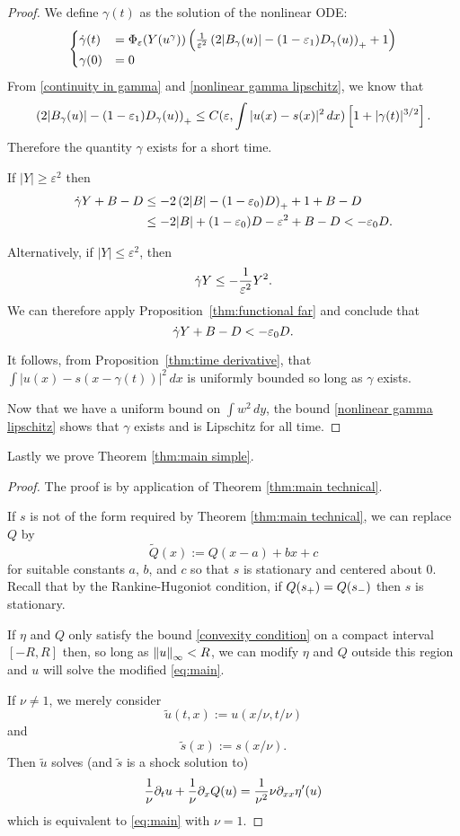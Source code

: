 \begin{proof}
We define $\gamma(t)$ as the solution of the nonlinear ODE:
\[ \begin{cases}
\dot{\gamma}(t) &= \Phi_\varepsilon(Y(u^\gamma)) \left( \frac{1}{\varepsilon^2} \left( 2|B_\gamma(u)| - (1-\varepsilon_1) D_\gamma(u) \right)_+ + 1 \right) \\
\gamma(0) &= 0
\end{cases} \]
From \eqref{continuity in gamma} and \eqref{nonlinear gamma lipschitz}, we know that
\[ \left( 2|B_\gamma(u)| - (1-\varepsilon_1) D_\gamma(u) \right)_+ \leq C(\varepsilon, \int |u(x) - s(x)|^2 \,dx) \left[ 1 + |\gamma(t)|^{3/2} \right]. \]
Therefore the quantity $\gamma$ exists for a short time.  

If $|Y| \geq \varepsilon^2$ then 
\begin{align*} 
\dot{\gamma} Y + B - D &\leq - 2 \left( 2|B| - (1-\varepsilon_0)D \right)_+ + 1 + B - D
\\ &\leq -2|B| + (1-\varepsilon_0)D - \varepsilon^2 + B - D < -\varepsilon_0 D.
\end{align*}

Alternatively, if $|Y| \leq \varepsilon^2$, then 
\[ \dot{\gamma} Y \leq - \frac{1}{\varepsilon^2} Y^2. \]
We can therefore apply Proposition~\ref{thm:functional far} and conclude that
\[ \dot{\gamma} Y + B - D < -\varepsilon_0 D. \]

It follows, from Proposition~\ref{thm:time derivative}, that $\int |u(x) - s(x-\gamma(t))|^2 \,dx$ is uniformly bounded so long as $\gamma$ exists.  

Now that we have a uniform bound on $\int w^2 \,dy$, the bound \eqref{nonlinear gamma lipschitz} shows that $\gamma$ exists and is Lipschitz for all time.  
\end{proof}

Lastly we prove Theorem \ref{thm:main simple}.  

\begin{proof}
The proof is by application of Theorem \ref{thm:main technical}.  

If $s$ is not of the form required by Theorem \ref{thm:main technical}, we can replace $Q$ by
\[ \tilde{Q}(x) := Q(x-a) + bx + c \]
for suitable constants $a$, $b$, and $c$ so that $s$ is stationary and centered about 0.  Recall that by the Rankine-Hugoniot condition, if $Q(s_+) = Q(s_-)$ then $s$ is stationary.  

If $\eta$ and $Q$ only satisfy the bound \eqref{convexity condition} on a compact interval $[-R,R]$ then, so long as $\left\lVert u\right\rVert_\infty < R$, we can modify $\eta$ and $Q$ outside this region and $u$ will solve the modified \eqref{eq:main}.  

If $\nu \neq 1$, we merely consider 
\[ \tilde{u}(t,x) := u(x/\nu, t/\nu) \]
and 
\[ \tilde{s}(x) := s(x/\nu). \]
Then $\tilde{u}$ solves (and $\tilde{s}$ is a shock solution to)
\[ \frac{1}{\nu} \partial_t u + \frac{1}{\nu} \partial_x Q(u) = \frac{1}{\nu^2} \nu \partial_{xx} \eta'(u) \]
which is equivalent to \eqref{eq:main} with $\nu = 1$.  
\end{proof}

%
%
%
%
